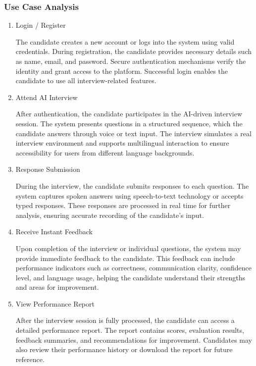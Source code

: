 \documentclass[12pt]{article}
\numberwithin{figure}{subsection}
\begin{document}
\newpage
\subsubsection{Use Case Analysis}
\begin{enumerate}

    \item { Login / Register }  
    \begin{itemize}
The candidate creates a new account or logs into the system using valid credentials. During registration, the candidate provides necessary details such as name, email, and password. Secure authentication mechanisms verify the identity and grant access to the platform. Successful login enables the candidate to use all interview-related features.
    \end{itemize}

    \item { Attend AI Interview }  
    \begin{itemize}
After authentication, the candidate participates in the AI-driven interview session. The system presents questions in a structured sequence, which the candidate answers through voice or text input. The interview simulates a real interview environment and supports multilingual interaction to ensure accessibility for users from different language backgrounds.
    \end{itemize}

    \item { Response Submission }  
    \begin{itemize}
During the interview, the candidate submits responses to each question. The system captures spoken answers using speech-to-text technology or accepts typed responses. These responses are processed in real time for further analysis, ensuring accurate recording of the candidate’s input.
    \end{itemize}

    \item { Receive Instant Feedback }  
    \begin{itemize}
Upon completion of the interview or individual questions, the system may provide immediate feedback to the candidate. This feedback can include performance indicators such as correctness, communication clarity, confidence level, and language usage, helping the candidate understand their strengths and areas for improvement.
    \end{itemize}

    \item { View Performance Report }  
    \begin{itemize}
After the interview session is fully processed, the candidate can access a detailed performance report. The report contains scores, evaluation results, feedback summaries, and recommendations for improvement. Candidates may also review their performance history or download the report for future reference.
    \end{itemize}

\end{enumerate}
\end{document}
